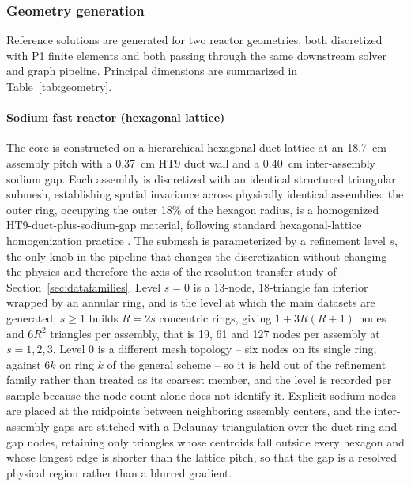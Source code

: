 \documentclass[preprint,12pt]{elsarticle}
\begin{document}
\subsubsection{Geometry generation}
\label{sec:geometry}

Reference solutions are generated for two reactor geometries, both discretized
with P1 finite elements and both passing through the same downstream solver and
graph pipeline. Principal dimensions are summarized in
Table~\ref{tab:geometry}.

\paragraph{Sodium fast reactor (hexagonal lattice)}
The core is constructed on a hierarchical hexagonal-duct lattice at an 18.7~cm
assembly pitch with a 0.37~cm HT9 duct wall and a 0.40~cm inter-assembly sodium
gap. Each assembly is discretized with an identical structured triangular
submesh, establishing spatial invariance across physically identical
assemblies; the outer ring, occupying the outer 18\% of the hexagon radius, is a
homogenized HT9-duct-plus-sodium-gap material, following standard
hexagonal-lattice homogenization practice \citep{scale}. The submesh is
parameterized by a refinement level $s$, the only knob in the pipeline that
changes the discretization without changing the physics and therefore the axis
of the resolution-transfer study of Section~\ref{sec:datafamilies}. Level $s=0$
is a 13-node, 18-triangle fan interior wrapped by an annular ring, and is the
level at which the main datasets are generated; $s\geq1$ builds $R=2s$
concentric rings, giving $1+3R(R+1)$ nodes and $6R^{2}$ triangles per assembly,
that is 19, 61 and 127 nodes per assembly at $s=1,2,3$. Level 0 is a different
mesh topology -- six nodes on its single ring, against $6k$ on ring $k$ of the
general scheme -- so it is held out of the refinement family rather than treated
as its coarsest member, and the level is recorded per sample because the node
count alone does not identify it. Explicit sodium nodes are placed at the
midpoints between neighboring assembly centers, and the inter-assembly gaps
are stitched with a Delaunay triangulation \citep{delaunay1934} over the
duct-ring and gap nodes,
retaining only triangles whose centroids fall outside every hexagon and whose
longest edge is shorter than the lattice pitch, so that the gap is a resolved
physical region rather than a blurred gradient.
\end{document}
